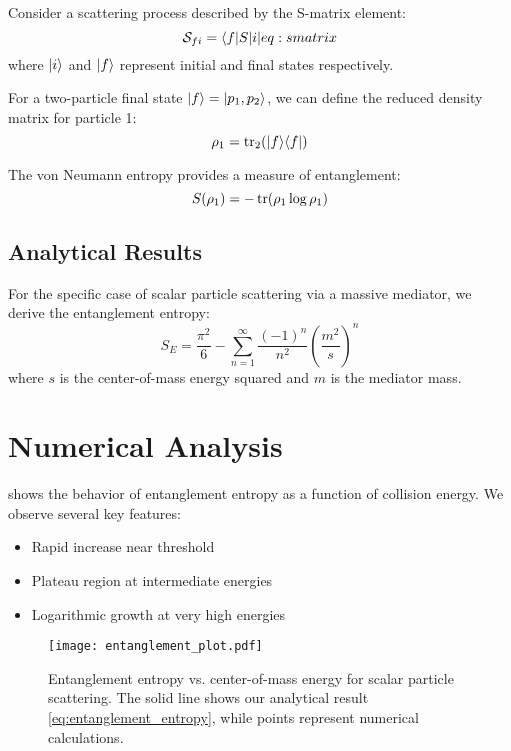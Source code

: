 \documentclass[arxiv,final,oneside,onecolumn]{../../arxiv-preprint}
\begin{document}
Consider a scattering process described by the S-matrix element:
\begin{equation}
\mathcal{S}_{fi} = \braket{f | S | i}
\label{eq:smatrix}
\end{equation}
where $|i\rangle$ and $|f\rangle$ represent initial and final states respectively.

For a two-particle final state $|f\rangle = |p_1, p_2\rangle$, we can define the 
reduced density matrix for particle 1:
\begin{equation}
\rho_1 = \operatorname{tr}_2(|f\rangle\langle f|)
\label{eq:reduced_density}
\end{equation}

The von Neumann entropy provides a measure of entanglement:
\begin{equation}
S(\rho_1) = -\operatorname{tr}(\rho_1 \log \rho_1)
\label{eq:von_neumann}
\end{equation}

\subsection{Analytical Results}

For the specific case of scalar particle scattering via a massive mediator, 
we derive the entanglement entropy:
\begin{equation}
S_E = \frac{\pi^2}{6} - \sum_{n=1}^{\infty} \frac{(-1)^n}{n^2} \left(\frac{m^2}{s}\right)^n
\label{eq:entanglement_entropy}
\end{equation}
where $s$ is the center-of-mass energy squared and $m$ is the mediator mass.

\section{Numerical Analysis}

 shows the behavior of entanglement entropy 
as a function of collision energy. We observe several key features:

\begin{itemize}
\item Rapid increase near threshold
\item Plateau region at intermediate energies  
\item Logarithmic growth at very high energies
\end{itemize}

\begin{figure}[htbp]
\centering
\texttt{[image: entanglement\_plot.pdf]}
\caption{Entanglement entropy vs. center-of-mass energy for scalar particle 
scattering. The solid line shows our analytical result \eqref{eq:entanglement_entropy}, 
while points represent numerical calculations.}
\label{fig:entanglement_vs_energy}
\end{figure}
\end{document}
